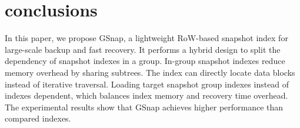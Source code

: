\documentclass[sigconf, nonacm]{acmart}
\begin{document}
\section{conclusions}
\label{Conclusions}
In this paper, we propose GSnap, a lightweight RoW-based snapshot index for large-scale backup and fast recovery. It performs a hybrid design to split the dependency of snapshot indexes in a group. In-group snapshot indexes reduce memory overhead by sharing subtrees. The index can directly locate data blocks instead of iterative traversal. Loading target snapshot group indexes instead of indexes dependent, which balances index memory and recovery time overhead. 
The experimental results show that GSnap achieves higher performance than
compared indexes.

\begin{acks}
\end{acks}




\end{document}
